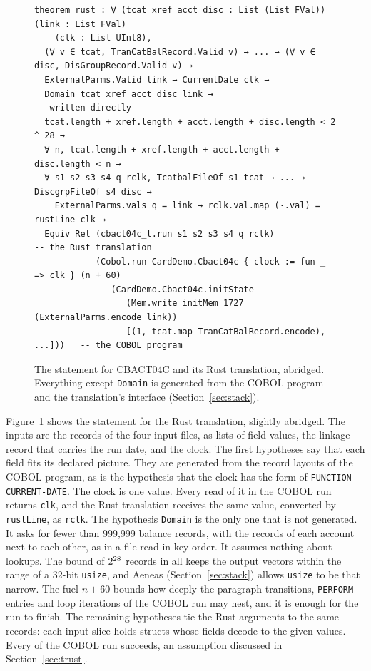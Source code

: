 \begin{figure}
\begin{lstlisting}[language=lean,basicstyle=\footnotesize\ttfamily]
theorem rust : ∀ (tcat xref acct disc : List (List FVal)) (link : List FVal)
    (clk : List UInt8),
  (∀ v ∈ tcat, TranCatBalRecord.Valid v) → ... → (∀ v ∈ disc, DisGroupRecord.Valid v) →
  ExternalParms.Valid link → CurrentDate clk →
  Domain tcat xref acct disc link →                          -- written directly
  tcat.length + xref.length + acct.length + disc.length < 2 ^ 28 →
  ∀ n, tcat.length + xref.length + acct.length + disc.length < n →
  ∀ s1 s2 s3 s4 q rclk, TcatbalFileOf s1 tcat → ... → DiscgrpFileOf s4 disc →
    ExternalParms.vals q = link → rclk.val.map (·.val) = rustLine clk →
  Equiv Rel (cbact04c_t.run s1 s2 s3 s4 q rclk)                       -- the Rust translation
            (Cobol.run CardDemo.Cbact04c { clock := fun _ => clk } (n + 60)
               (CardDemo.Cbact04c.initState
                  (Mem.write initMem 1727 (ExternalParms.encode link))
                  [(1, tcat.map TranCatBalRecord.encode), ...]))   -- the COBOL program
\end{lstlisting}
\caption{The statement for CBACT04C and its Rust translation, abridged. Everything except \texttt{Domain} is generated from the COBOL program and the translation's interface
(Section~\ref{sec:stack}).}
\label{fig:stmt}
\end{figure}

Figure~\ref{fig:stmt} shows the statement for the Rust translation, slightly abridged. The inputs are the records of
the four input files, as lists of field values, the linkage record that carries the run date, and the clock. The first
hypotheses say that each field fits its declared picture. They are generated from the record layouts of the COBOL
program, as is the hypothesis that the clock has the form of \texttt{FUNCTION CURRENT-DATE}. The clock is one value. Every read of it in the COBOL run returns \texttt{clk}, and the Rust translation receives the same value,
converted by \texttt{rustLine}, as \texttt{rclk}. The hypothesis
\texttt{Domain} is the only one that is not generated. It asks for fewer than 999,999 balance records, with the records of
each account next to each other, as in a file read in key order. It assumes nothing about lookups. The bound of
$2^{28}$ records in all keeps the output vectors within the range of a 32-bit \texttt{usize}, and Aeneas
(Section~\ref{sec:stack}) allows \texttt{usize} to be that narrow. The fuel $n + 60$
bounds how deeply the paragraph transitions, \texttt{PERFORM} entries and loop iterations of the COBOL run may nest, and it is
enough for the run to finish. The remaining hypotheses tie the Rust arguments to the same records: each input slice holds structs whose fields decode to the given values. Every  of the COBOL run succeeds, an assumption discussed in Section~\ref{sec:trust}.

